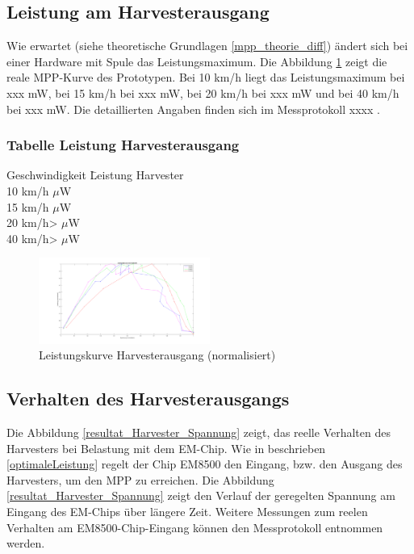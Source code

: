 \newpage  %
\subsection{Leistung am Harvesterausgang}

Wie erwartet (siehe theoretische Grundlagen \ref{mpp_theorie_diff}) ändert sich bei einer Hardware mit Spule das Leistungsmaximum. Die Abbildung \ref{mpp_resultat_harvester} zeigt die reale MPP-Kurve des Prototypen. Bei 10 km/h liegt das Leistungsmaximum bei xxx mW, bei 15 km/h bei xxx mW, bei 20 km/h bei xxx mW und bei 40 km/h bei xxx mW. Die detaillierten Angaben finden sich im Messprotokoll xxxx .

\subsubsection*{Tabelle Leistung Harvesterausgang}
\begin{tabbing}
    Geschwindigkeit \quad\= Leistung Harvester \\[0.8ex]
    10 km/h    $\mu$W \\
    15 km/h    $\mu$W \\
    20 km/h>  $\mu$W \\
    40 km/h>  $\mu$W \\
\end{tabbing}  

\begin{figure}[ht]
    \includegraphics[width=0.5\textwidth]{4Resultate/imag/MPPHarvester.png} 
    \caption{Leistungskurve Harvesterausgang (normalisiert)}
    \label{mpp_resultat_harvester}
\end{figure}


\newpage  %
\subsection{Verhalten des Harvesterausgangs}

Die Abbildung \ref{resultat_Harvester_Spannung} zeigt, das reelle Verhalten des Harvesters bei Belastung mit dem EM-Chip. Wie in beschrieben \ref{optimaleLeistung} regelt der Chip EM8500 den Eingang, bzw. den Ausgang des Harvesters, um den MPP zu erreichen. Die Abbildung \ref{resultat_Harvester_Spannung} zeigt den Verlauf der geregelten Spannung am Eingang des EM-Chips über längere Zeit. Weitere Messungen zum reelen Verhalten am EM8500-Chip-Eingang können den Messprotokoll  entnommen werden.


